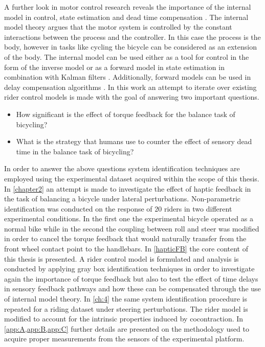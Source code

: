 A further look in motor control research  reveals the importance of the internal model in control, state estimation and dead time compensation \cite{francis1976internal, garcia1982internal, wolpert1995internal, gillespie2016human}. The internal model  theory argues that the motor system is controlled by the constant interactions between the process and the controller. In this case the process is the body, however in tasks like cycling the bicycle can be considered as an extension of the body. The internal model can be used either as a tool for control in the form of the inverse model \cite{edelmann2015,getz1995internal} or as a forward model in state estimation in combination with Kalman filters \cite{wolpert1995internal}. Additionally, forward models can be used in delay compensation algorithms \cite{miall1993cerebellum,van2001adaptive}. 
\newpage
In this work an attempt to iterate over existing rider control models is made with the goal of answering two important questions. 
\begin{itemize}
        \item How significant is the effect of torque feedback for the balance task of bicycling?
        \item What is the strategy that humans use to counter the effect of sensory dead time in the balance task of bicycling?
\end{itemize}

In order to answer the above questions system identification techniques are employed using  the experimental dataset acquired within the scope of this thesis. In \cref{chapter2} an attempt is made to investigate the effect of haptic feedback in the task of balancing a bicycle under lateral perturbations. Non-parametric identification was conducted on the response of 20 riders in two different experimental conditions. In the first one the experimental bicycle operated as a normal bike while in the second the coupling between roll and steer was modified in order to cancel the torque feedback that would naturally transfer from the front wheel contact point to the handlebars. In \cref{hapticFB} the core content of this thesis is presented. A rider control model is formulated and  analysis is conducted by applying gray box identification techniques in order to investigate again the importance of torque feedback but also to test the effect of time delays in sensory feedback pathways and how these can be compensated through the use of internal model theory. In \cref{ch:4} the same system identification procedure is repeated for a riding dataset under steering perturbations. The rider model is modified to account for the intrinsic properties induced by cocontraction. In \cref{app:A,app:B,app:C} further details are presented on the methodology used to acquire proper measurements from the sensors of the experimental platform.


